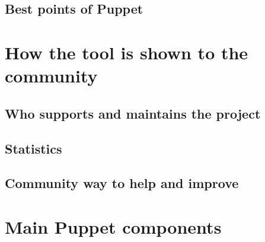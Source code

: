 \documentclass[12pt,a4paper,openright,twoside]{book}
\begin{document}
\subsection{Best points of Puppet}


\section{How the tool is shown to the community}


\subsection{Who supports and maintains the project}

\subsection{Statistics}

\subsection{Community way to help and improve}

\section{Main Puppet components}



\end{document}
